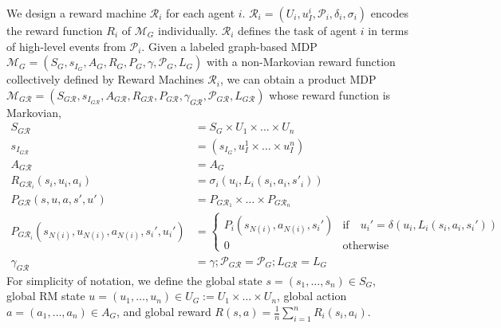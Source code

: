\documentclass[conf]{new-aiaa}
\begin{document}
We design a reward machine $\mathcal{R}_i$ for each agent $i$. $\mathcal{R}_i = (U_i, u_I^i, \mathcal{P}_i, \delta_i, \sigma_i)$ encodes the reward function $R_i$ of $\mathcal{M}_G$ individually. $\mathcal{R}_i$ defines the task of agent $i$ in terms of high-level events from $\mathcal{P}_i$. Given a labeled graph-based MDP $\mathcal{M}_G=(S_G, s_{I_G}, A_G, R_G, P_G, \gamma, \mathcal{P}_G, L_G)$ with a non-Markovian reward function collectively defined by Reward Machines $\mathcal{R}_i$, we can obtain a product MDP $\mathcal{M}_{G \mathcal{R}} = (S_{G \mathcal{R}}, s_{I_{G \mathcal{R}}}, A_{G \mathcal{R}}, R_{G \mathcal{R}}, P_{G \mathcal{R}}, \gamma_{G \mathcal{R}}, \mathcal{P}_{G \mathcal{R}}, L_{G \mathcal{R}})$ whose reward function is Markovian, 
\begin{equation}
    \begin{aligned}
        S_{G \mathcal{R}} &= S_G \times U_1 \times \dots \times U_n \\
        s_{I_{G \mathcal{R}}} &= (s_{I_G}, u_I^1 \times \dots \times u_I^n) \\
        A_{G \mathcal{R}} &= A_G \\
        R_{G \mathcal{R}_i}(s_i, u_i, a_i) &=  \sigma_i(u_i, L_i(s_i, a_i, s'_i))\\
        P_{G \mathcal{R}}(s, u, a, s', u') &=  P_{G \mathcal{R}_1} \times \dots \times P_{G \mathcal{R}_n}\\
        P_{G \mathcal{R}_i}(s_{N(i)}, u_{N(i)}, a_{N(i)}, s_i', u_i')
        &= \begin{cases}
                                        P_i(s_{N(i)}, a_{N(i)}, s_i')  & \text{if} \quad u_i' = \delta(u_i, L_i(s_i, a_i, s_i'))\\
                                        0  & \mbox{otherwise}
                                    \end{cases} \\
        \gamma_{G \mathcal{R}} &= \gamma; \mathcal{P}_{G \mathcal{R}} = \mathcal{P}_G; L_{G \mathcal{R}} = L_G
    \end{aligned}
    \label{multi_product_Markovian}
\end{equation}
For simplicity of notation, we define the global state $s = (s_1, \dots, s_n) \in S_G$, global RM state $u = (u_1, \dots, u_n) \in U_G:= U_1 \times \dots \times U_n$, global action $a = (a_1, \dots, a_n) \in A_G$, and global reward $R(s, a) = \frac{1}{n} \sum_{i=1}^{n} R_i(s_i, a_i)$.
\end{document}
